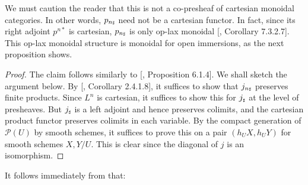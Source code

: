 \begin{rem}
We must caution the reader that this is not a co-presheaf of cartesian monoidal categories. In other words, $p_{n{\mathord{\text{\tiny $\sharp$}}}}$ need not be a cartesian functor. In fact, since its right adjoint $p^{n*}$ is cartesian, $p_{n{\mathord{\text{\tiny $\sharp$}}}}$ is only op-lax monoidal [\cite{lurie2017higher}, Corollary 7.3.2.7]. This op-lax monoidal structure is monoidal for open immersions, as the next proposition shows.
\begin{proof}
The claim follows similarly to [\cite{khan2016motivic}, Proposition 6.1.4]. We shall sketch the argument below. By [\cite{lurie2017higher}, Corollary 2.4.1.8], it suffices to show that $j_{n{\mathord{\text{\tiny $\sharp$}}}}$ preserves finite products. Since $L^n$ is cartesian, it suffices to show this for $j_{\mathord{\text{\tiny $\sharp$}}}$ at the level of presheaves. But $j_{\mathord{\text{\tiny $\sharp$}}}$ is a left adjoint and hence preserves colimits, and the cartesian product functor preserves colimits in each variable. By the compact generation of $\mathcal{P}(U)$ by smooth schemes, it suffices to prove this on a pair $(h_UX,h_UY)$ for smooth schemes $X,Y/U$. This is clear since the diagonal of $j$ is an isomorphism.
\end{proof}
\end{rem}


It follows immediately from  that:

